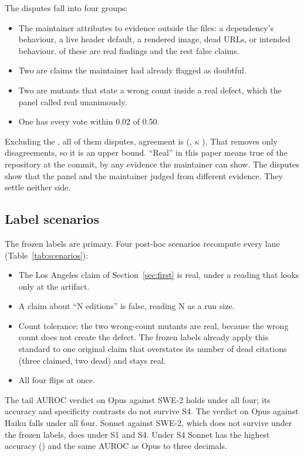 \documentclass[11pt]{article}
\begin{document}
The  disputes fall into four groups:
\begin{itemize}
  \item The maintainer attributes  to evidence outside the files: a dependency's behaviour, a live header default, a rendered image, dead URLs, or intended behaviour.  of these are real findings and the rest false claims.
  \item Two are claims the maintainer had already flagged as doubtful.
  \item Two are mutants that state a wrong count inside a real defect, which the panel called real unanimously.
  \item One has every vote within 0.02 of 0.50.
\end{itemize}
Excluding the , all of them disputes, agreement is  (, $\kappa$ ). That removes only disagreements, so it is an upper bound. ``Real'' in this paper means true of the repository at the commit, by any evidence the maintainer can show. The  disputes show that the panel and the maintainer judged from different evidence. They settle neither side.

\subsection{Label scenarios}

The frozen labels are primary. Four post-hoc scenarios recompute every lane (Table~\ref{tab:scenarios}):
\begin{itemize}
  \item[S1] The Los Angeles claim of Section~\ref{sec:first} is real, under a reading that looks only at the artifact.
  \item[S2] A claim about ``N editions'' is false, reading N as a run size.
  \item[S3] Count tolerance: the two wrong-count mutants are real, because the wrong count does not create the defect. The frozen labels already apply this standard to one original claim that overstates its number of dead citations (three claimed, two dead) and stays real.
  \item[S4] All four flips at once.
\end{itemize}

The tail AUROC verdict on Opus against SWE-2 holds under all four; its accuracy and specificity contrasts do not survive S4. The verdict on Opus against Haiku falls under all four. Sonnet against SWE-2, which does not survive under the frozen labels, does under S1 and S4. Under S4 Sonnet has the highest accuracy () and the same AUROC as Opus to three decimals.
\end{document}
